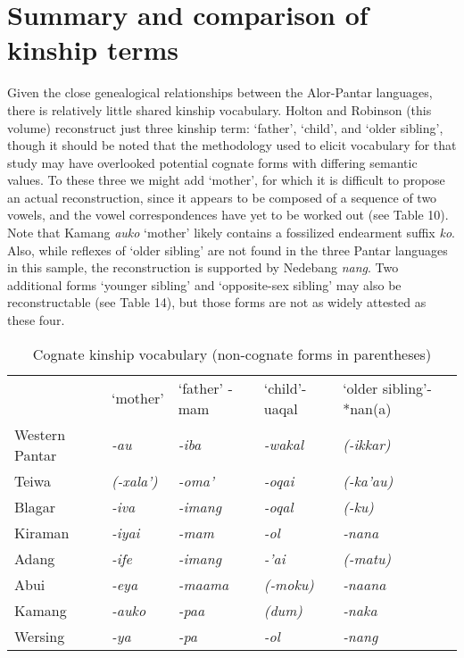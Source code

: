 \section{Summary and comparison of kinship terms}
Given the close genealogical relationships between the Alor-Pantar languages, there is relatively little shared kinship vocabulary. Holton and Robinson (this volume) reconstruct just three kinship term: `father', `child', and `older sibling', though it should be noted that the methodology used to elicit vocabulary for that study may have overlooked potential cognate forms with differing semantic values. To these three we might add `mother', for which it is difficult to propose an actual reconstruction, since it appears to be composed of a sequence of two vowels, and the vowel correspondences have yet to be worked out (see Table 10). Note that Kamang \textit{auko} `mother' likely contains a fossilized endearment suffix \textit{ko}. Also, while reflexes of `older sibling' are not found in the three Pantar languages in this sample, the reconstruction is supported by Nedebang \textit{nang}. Two additional forms `younger sibling' and `opposite-sex sibling' may also be reconstructable (see Table 14), but those forms are not as widely attested as these four.



\begin{table}\centering
\begin{tabular}{lllll} & `mother' & `father' \newline *-mam & `child'\newline*-uaqal & `older sibling'\newline{}-*nan(a)\\
Western Pantar & \textit{{}-au} & \textit{{}-iba} & \textit{{}-wakal} & \textit{(-ikkar)}\\
Teiwa & \textit{(-xala')} & \textit{{}-oma'} & \textit{{}-oqai} & \textit{(-ka'au)}\\
Blagar & \textit{{}-iva} & \textit{{}-imang} & \textit{{}-oqal} & \textit{(-ku)}\\
Kiraman & \textit{{}-iyai} & \textit{{}-mam} & \textit{{}-ol} & \textit{{}-nana}\\
Adang & \textit{{}-ife} & \textit{{}-imang} & \textit{{}-'ai} & \textit{(-matu)}\\
Abui & \textit{{}-eya} & \textit{{}-maama} & \textit{(-moku)} & \textit{{}-naana}\\
Kamang & \textit{{}-auko} & \textit{{}-paa} & \textit{(dum)} & \textit{{}-naka}\\
Wersing & \textit{{}-ya} & \textit{{}-pa} & \textit{{}-ol} & \textit{{}-nang}\\
\end{tabular}
\caption{Cognate kinship vocabulary (non-cognate forms in parentheses)}
\end{table}

